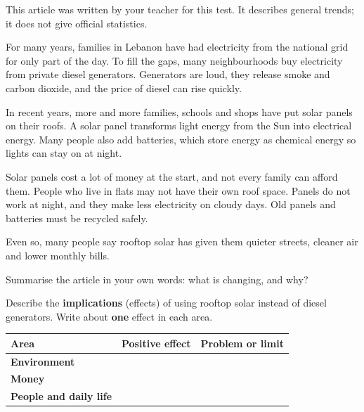 \documentclass[12pt,a4paper]{article}
\newcommand{\qs}{\par\vspace{10pt}\needspace{7\baselineskip}}
\begin{document}
\begin{tcolorbox}[enhanced,colback=white,colframe=muted!60,arc=6pt,boxrule=0.8pt,left=10pt,right=10pt,top=6pt,bottom=6pt,
  title={\bfseries Rooftop solar: a quiet change across Lebanon},coltitle=navy,colbacktitle=panel,fonttitle=\large\bfseries]
{\small\color{muted}This article was written by your teacher for this test. It describes general trends; it does not give official statistics.}\par\vspace{3pt}
For many years, families in Lebanon have had electricity from the national grid for only part of the day. To fill the gaps, many neighbourhoods buy electricity from private diesel generators. Generators are loud, they release smoke and carbon dioxide, and the price of diesel can rise quickly.

In recent years, more and more families, schools and shops have put solar panels on their roofs. A solar panel transforms light energy from the Sun into electrical energy. Many people also add batteries, which store energy as chemical energy so lights can stay on at night.

Solar panels cost a lot of money at the start, and not every family can afford them. People who live in flats may not have their own roof space. Panels do not work at night, and they make less electricity on cloudy days. Old panels and batteries must be recycled safely.

Even so, many people say rooftop solar has given them quieter streets, cleaner air and lower monthly bills.
\par{}
\end{tcolorbox}

\qs{} Summarise the article in your own words: what is changing, and why?

\qs{} Describe the \textbf{implications} (effects) of using rooftop solar instead of diesel generators. Write about \textbf{one} effect in each area.\par\vspace{2pt}
\renewcommand{\arraystretch}{1.6}
\begin{tabular}{|p{3.4cm}|p{6.2cm}|p{6.2cm}|}
\hline\rowcolor{panel}\textbf{Area} & \textbf{Positive effect} & \textbf{Problem or limit}\\\hline
\textbf{Environment} & & \\[10mm]\hline
\textbf{Money} & & \\[10mm]\hline
\textbf{People and daily life} & & \\[10mm]\hline
\end{tabular}
\renewcommand{\arraystretch}{1.25}
\end{document}
